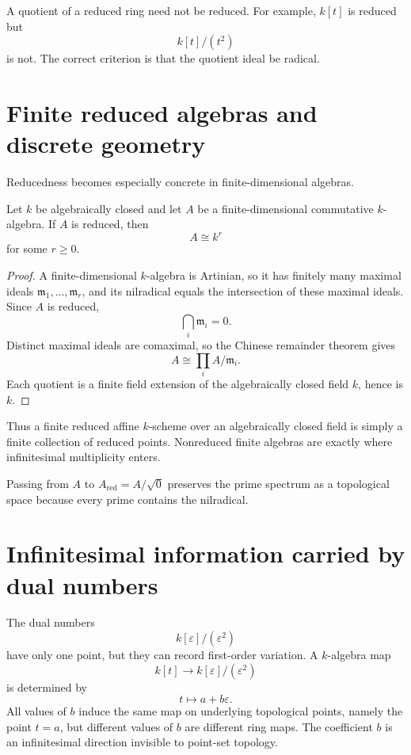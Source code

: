 \begin{warning}[Quotients]
A quotient of a reduced ring need not be reduced.  For example, $k[t]$ is reduced but
\[
k[t]/(t^2)
\]
is not.  The correct criterion is that the quotient ideal be radical.
\end{warning}

\section{Finite reduced algebras and discrete geometry}

Reducedness becomes especially concrete in finite-dimensional algebras.

\begin{proposition}
Let $k$ be algebraically closed and let $A$ be a finite-dimensional commutative
$k$-algebra.  If $A$ is reduced, then
\[
A\cong k^r
\]
for some $r\ge0$.
\end{proposition}

\begin{proof}
A finite-dimensional $k$-algebra is Artinian, so it has finitely many maximal ideals
$\mathfrak m_1,\dots,\mathfrak m_r$, and its nilradical equals the intersection of these
maximal ideals.  Since $A$ is reduced,
\[
\bigcap_i\mathfrak m_i=0.
\]
Distinct maximal ideals are comaximal, so the Chinese remainder theorem gives
\[
A\cong\prod_i A/\mathfrak m_i.
\]
Each quotient is a finite field extension of the algebraically closed field $k$, hence is
$k$.
\end{proof}

Thus a finite reduced affine $k$-scheme over an algebraically closed field is simply a
finite collection of reduced points.  Nonreduced finite algebras are exactly where
infinitesimal multiplicity enters.

\begin{example}\label{ex:vi10-expand-03}
Passing from $A$ to $A_{\mathrm{red}}=A/\sqrt{0}$ preserves the prime spectrum as a topological space because every prime contains the nilradical.
\end{example}
\section{Infinitesimal information carried by dual numbers}

The dual numbers
\[
k[\varepsilon]/(\varepsilon^2)
\]
have only one point, but they can record first-order variation.  A $k$-algebra map
\[
k[t]\longrightarrow k[\varepsilon]/(\varepsilon^2)
\]
is determined by
\[
t\longmapsto a+b\varepsilon.
\]
All values of $b$ induce the same map on underlying topological points, namely the point
$t=a$, but different values of $b$ are different ring maps.  The coefficient $b$ is an
infinitesimal direction invisible to point-set topology.

